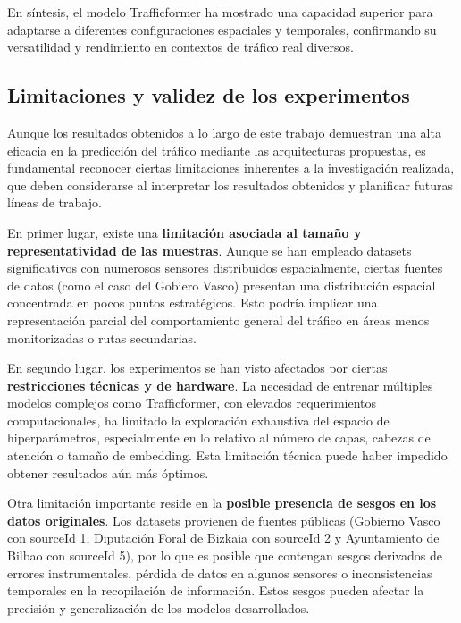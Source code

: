 En síntesis, el modelo Trafficformer ha mostrado una capacidad superior para adaptarse a diferentes configuraciones espaciales y temporales, confirmando su versatilidad y rendimiento en contextos de tráfico real diversos.

\subsection{Limitaciones y validez de los experimentos}
\label{sec:limitaciones_validez}

\begin{comment}
	- Discusión sobre limitaciones técnicas, posibles sesgos, restricciones de hardware, tamaño de muestra, etc.
\end{comment}

Aunque los resultados obtenidos a lo largo de este trabajo demuestran una alta eficacia en la predicción del tráfico mediante las arquitecturas propuestas, es fundamental reconocer ciertas limitaciones inherentes a la investigación realizada, que deben considerarse al interpretar los resultados obtenidos y planificar futuras líneas de trabajo.

En primer lugar, existe una \textbf{limitación asociada al tamaño y representatividad de las muestras}. Aunque se han empleado datasets significativos con numerosos sensores distribuidos espacialmente, ciertas fuentes de datos (como el caso del Gobiero Vasco) presentan una distribución espacial concentrada en pocos puntos estratégicos. Esto podría implicar una representación parcial del comportamiento general del tráfico en áreas menos monitorizadas o rutas secundarias.

En segundo lugar, los experimentos se han visto afectados por ciertas \textbf{restricciones técnicas y de hardware}. La necesidad de entrenar múltiples modelos complejos como Trafficformer, con elevados requerimientos computacionales, ha limitado la exploración exhaustiva del espacio de hiperparámetros, especialmente en lo relativo al número de capas, cabezas de atención o tamaño de embedding. Esta limitación técnica puede haber impedido obtener resultados aún más óptimos.

Otra limitación importante reside en la \textbf{posible presencia de sesgos en los datos originales}. Los datasets provienen de fuentes públicas (Gobierno Vasco con sourceId 1, Diputación Foral de Bizkaia con sourceId 2 y Ayuntamiento de Bilbao con sourceId 5), por lo que es posible que contengan sesgos derivados de errores instrumentales, pérdida de datos en algunos sensores o inconsistencias temporales en la recopilación de información. Estos sesgos pueden afectar la precisión y generalización de los modelos desarrollados.

